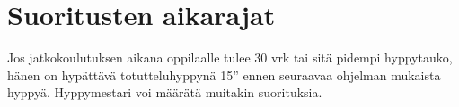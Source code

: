 \section{ Suoritusten aikarajat }
\label{yhteenveto-jatkokoulutus-suoritusten-aikarajat}


Jos jatkokoulutuksen aikana oppilaalle tulee 30 vrk tai sitä pidempi hyppytauko, hänen on hypättävä totutteluhyppynä 15'' ennen seuraavaa ohjelman mukaista hyppyä. Hyppymestari voi määrätä muitakin suorituksia. 

